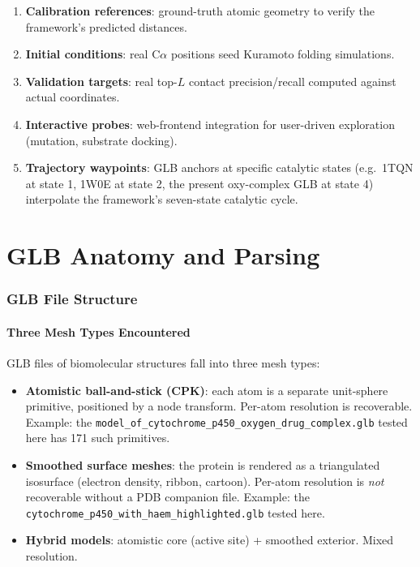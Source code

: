 \documentclass[11pt,twocolumn,a4paper]{article}
\theoremstyle{definition}
\theoremstyle{remark}
\begin{document}
\begin{enumerate}[leftmargin=*, nosep]
\item \textbf{Calibration references}: ground-truth atomic geometry to
  verify the framework's predicted distances.
\item \textbf{Initial conditions}: real C$\alpha$ positions seed
  Kuramoto folding simulations.
\item \textbf{Validation targets}: real top-$L$ contact precision/recall
  computed against actual coordinates.
\item \textbf{Interactive probes}: web-frontend integration for
  user-driven exploration (mutation, substrate docking).
\item \textbf{Trajectory waypoints}: GLB anchors at specific catalytic
  states (e.g.\ 1TQN at state 1, 1W0E at state 2, the present oxy-complex
  GLB at state 4) interpolate the framework's seven-state catalytic
  cycle.
\end{enumerate}

\part{GLB Anatomy and Parsing}

\section{GLB File Structure}
\label{sec:glb_anatomy}

\subsection{Three Mesh Types Encountered}

GLB files of biomolecular structures fall into three mesh types:

\begin{itemize}[leftmargin=*, nosep]
\item \textbf{Atomistic ball-and-stick (CPK)}: each atom is a separate
  unit-sphere primitive, positioned by a node transform. Per-atom
  resolution is recoverable. Example: the
  \texttt{model\_of\_cytochrome\_p450\_oxygen\_drug\_complex.glb} tested
  here has 171 such primitives.
\item \textbf{Smoothed surface meshes}: the protein is rendered as a
  triangulated isosurface (electron density, ribbon, cartoon). Per-atom
  resolution is \emph{not} recoverable without a PDB companion file.
  Example: the \texttt{cytochrome\_p450\_with\_haem\_highlighted.glb}
  tested here.
\item \textbf{Hybrid models}: atomistic core (active site) + smoothed
  exterior. Mixed resolution.
\end{itemize}
\end{document}
